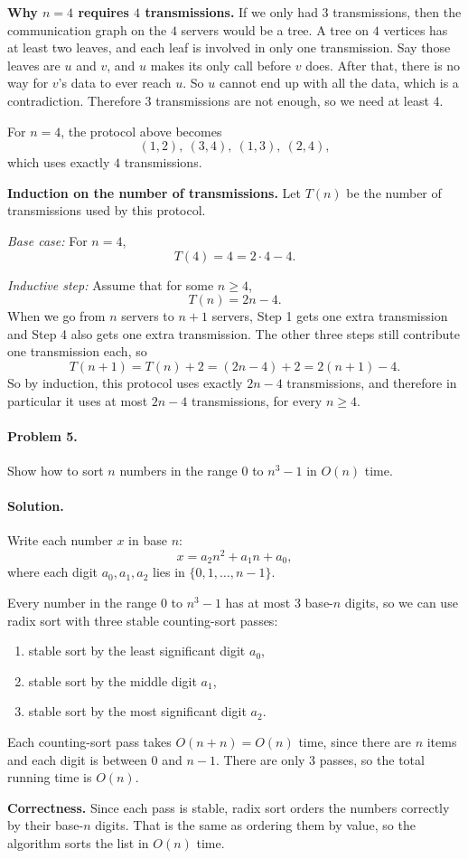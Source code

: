 \documentclass[10pt]{article}
\begin{document}
\textbf{Why $n=4$ requires $4$ transmissions.} If we only had $3$ transmissions, then the communication graph on the $4$ servers would be a tree.  A tree on $4$ vertices has at least two leaves, and each leaf is involved in only one transmission.  Say those leaves are $u$ and $v$, and $u$ makes its only call before $v$ does.  After that, there is no way for $v$'s data to ever reach $u$.  So $u$ cannot end up with all the data, which is a contradiction.  Therefore $3$ transmissions are not enough, so we need at least $4$.

For $n=4$, the protocol above becomes
\[
(1,2),\ (3,4),\ (1,3),\ (2,4),
\]
which uses exactly $4$ transmissions.

\textbf{Induction on the number of transmissions.} Let $T(n)$ be the number of transmissions used by this protocol.

\emph{Base case:} For $n=4$,
\[
T(4)=4=2\cdot 4-4.
\]

\emph{Inductive step:} Assume that for some $n\ge 4$,
\[
T(n)=2n-4.
\]
When we go from $n$ servers to $n+1$ servers, Step 1 gets one extra transmission and Step 4 also gets one extra transmission.  The other three steps still contribute one transmission each, so
\[
T(n+1)=T(n)+2=(2n-4)+2=2(n+1)-4.
\]
So by induction, this protocol uses exactly $2n-4$ transmissions, and therefore in particular it uses at most $2n-4$ transmissions, for every $n\ge 4$.

\paragraph{Problem 5.}  Show how to sort $n$ numbers in the range $0$ to $n^3 -1$ in $O(n)$ time.

\paragraph{Solution.} Write each number $x$ in base $n$:
\[
x=a_2n^2+a_1n+a_0,
\]
where each digit $a_0,a_1,a_2$ lies in $\{0,1,\dots,n-1\}$.

Every number in the range $0$ to $n^3-1$ has at most $3$ base-$n$ digits, so we can use radix sort with three stable counting-sort passes:
\begin{enumerate}
\item stable sort by the least significant digit $a_0$,
\item stable sort by the middle digit $a_1$,
\item stable sort by the most significant digit $a_2$.
\end{enumerate}

Each counting-sort pass takes $O(n+n)=O(n)$ time, since there are $n$ items and each digit is between $0$ and $n-1$.  There are only $3$ passes, so the total running time is $O(n)$.

\textbf{Correctness.} Since each pass is stable, radix sort orders the numbers correctly by their base-$n$ digits.  That is the same as ordering them by value, so the algorithm sorts the list in $O(n)$ time.
 
\end{document}
